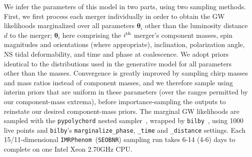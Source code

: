 \documentclass[%
 reprint,
 superscriptaddress,
 nofootinbib,
 amsmath,amssymb,
 aps,
]{revtex4-2}
\newcommand{\hubble}{\ensuremath{H_0}}
\newcommand{\decel}{\ensuremath{q_0}}
\newcommand{\jerk}{\ensuremath{j_0}}
\newcommand{\prob}{\ensuremath{{\rm P}}}
\newcommand{\dgw}{\hat{\bm{x}}}
\newcommand{\seobnr}{\texttt{SEOBNR}}
\newcommand{\imrp}{\texttt{IMRPhenom}}
\begin{document}
We infer the parameters of this model in two parts, using two sampling methods. First, we first process each merger individually in order to obtain the GW likelihoods marginalized over all parameters $\boldsymbol{\theta}_i$ other than the luminosity distance $d$ to the merger;
$\boldsymbol{\theta}_i$ here comprising the $i^{\rm th}$ merger's component masses, spin magnitudes and orientations (where appropriate), inclination, polarization angle, NS tidal deformability, and time and phase at coalescence. We adopt priors identical to the distributions used in the generative model for all parameters other than the masses. Convergence is greatly improved by sampling chirp masses and mass ratios instead of component masses, and we therefore sample using interim priors that are uniform in these parameters (over the ranges permitted by our component-mass extrema), before importance-sampling the outputs to reinstate our desired component-mass priors. The marginal GW likelihoods are sampled with the \texttt{pypolychord} nested sampler~\cite{Handley_etal:2015a,Handley_etal:2015b}, wrapped by \texttt{bilby}~\cite{Ashton_etal:2019}, using 1000 live points and \texttt{bilby}'s \texttt{marginalize\_phase}, \texttt{\_time} and \texttt{\_distance} settings. Each 15/11-dimensional \imrp\ (\seobnr) sampling run takes 6-14 (4-6) days to complete on one Intel Xeon 2.70GHz CPU.
\end{document}
